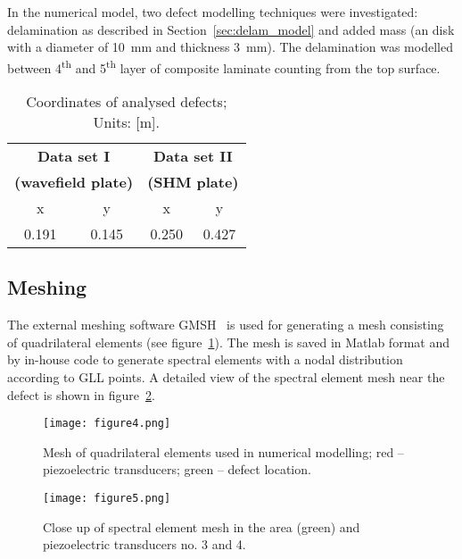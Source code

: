 In the numerical model, two defect modelling techniques were investigated: delamination as described in Section~\ref{sec:delam_model} and added mass (an   disk with a diameter of 10~mm and thickness 3~mm). The delamination was modelled between 4\textsuperscript{th} and 5\textsuperscript{th} layer of composite laminate counting from the top surface.

\begin{table}
	\caption{Coordinates of analysed defects; Units: [m].}
	\begin{indented}
		\item[]\begin{tabular}{cccc} 
			\toprule
			\multicolumn{2}{c}{\textbf{Data set I} }	& \multicolumn{2}{c}{\textbf{Data set II} } \\
			\multicolumn{2}{c}{\textbf{(wavefield plate)} }	& \multicolumn{2}{c}{\textbf{(SHM plate)} } \\
			\cmidrule(lr){1-2} \cmidrule(lr){3-4}
			x & y &  x &  y  \\
			0.191 & 0.145 & 0.250  & 0.427 \\ 
			\bottomrule 
		\end{tabular} 
	\end{indented}
	\label{tab:defect_coordinates}
\end{table}	

\subsection{Meshing}
The external meshing software GMSH~\cite{Geuzaine2009} is used for generating a mesh consisting of quadrilateral elements (see figure~\ref{fig:quad_mesh}). The mesh is saved in Matlab format and   by in-house code to generate spectral elements with a nodal distribution according to GLL points. A detailed view of the spectral element mesh near the defect is shown in figure~\ref{fig:spec_mesh_zoom}. 

\begin{figure} [h!]
	\centering
\texttt{[image: figure4.png]}	
\caption{Mesh of quadrilateral elements used in numerical modelling; red -- piezoelectric transducers; green -- defect location.}
	\label{fig:quad_mesh}
\end{figure}

\begin{figure} [h!]
	\centering
\texttt{[image: figure5.png]}	
\caption{Close up of spectral element mesh in the   area (green) and piezoelectric transducers no. 3 and 4.}
	\label{fig:spec_mesh_zoom}
\end{figure}
\clearpage

